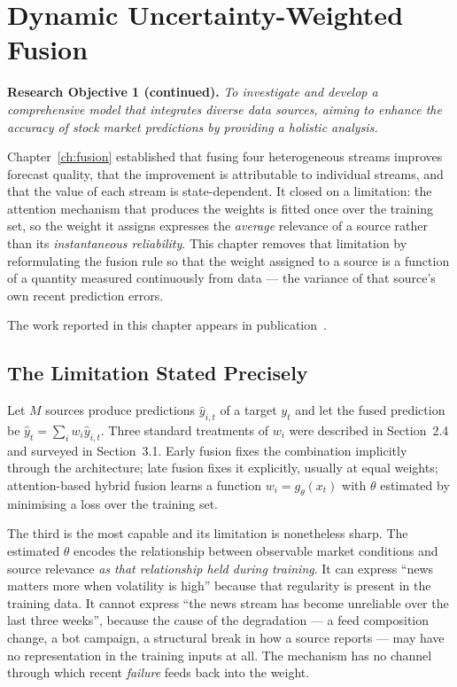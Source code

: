 \chapter{Dynamic Uncertainty-Weighted Fusion}
\label{ch:dynfusion}

\textbf{Research Objective 1 (continued).} \emph{To investigate and develop a comprehensive
model that integrates diverse data sources, aiming to enhance the accuracy of stock market
predictions by providing a holistic analysis.}

\vspace{0.4em}
Chapter~\ref{ch:fusion} established that fusing four heterogeneous streams improves forecast
quality, that the improvement is attributable to individual streams, and that the value of each
stream is state-dependent. It closed on a limitation: the attention mechanism that produces the
weights is fitted once over the training set, so the weight it assigns expresses the
\emph{average} relevance of a source rather than its \emph{instantaneous reliability}. This
chapter removes that limitation by reformulating the fusion rule so that the weight assigned to a
source is a function of a quantity measured continuously from data --- the variance of that
source's own recent prediction errors.

The work reported in this chapter appears in publication~.

\section{The Limitation Stated Precisely}
\label{sec:dyn-problem}

Let $M$ sources produce predictions $\hat{y}_{i,t}$ of a target $y_t$ and let the fused
prediction be $\hat{y}_t = \sum_i w_i \hat{y}_{i,t}$. Three standard treatments of $w_i$ were
described in Section~2.4 and surveyed in Section~3.1. Early fusion fixes the combination
implicitly through the architecture; late fusion fixes it explicitly, usually at equal weights;
attention-based hybrid fusion learns a function $w_i = g_\theta(x_t)$ with $\theta$ estimated by
minimising a loss over the training set.

The third is the most capable and its limitation is nonetheless sharp. The estimated $\theta$
encodes the relationship between observable market conditions and source relevance \emph{as that
relationship held during training}. It can express ``news matters more when volatility is high''
because that regularity is present in the training data. It cannot express ``the news stream has
become unreliable over the last three weeks'', because the cause of the degradation --- a feed
composition change, a bot campaign, a structural break in how a source reports --- may have no
representation in the training inputs at all. The mechanism has no channel through which recent
\emph{failure} feeds back into the weight.

